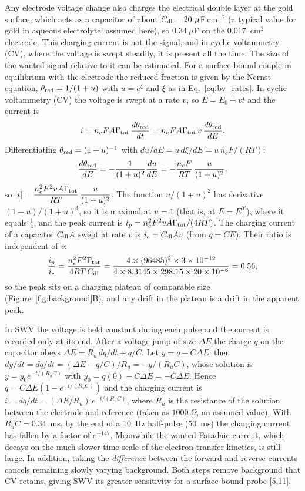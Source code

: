 \documentclass[10pt,a4paper]{article}
\numberwithin{equation}{section}
\newcommand{\cit}[1]{[#1]}
\newcommand{\Grtot}{\Gamma_{\rm tot}}
\newcommand{\Eform}{E^{0\prime}}
\newcommand{\figref}[1]{Figure~\ref{#1}}
\newcommand{\Cdev}{0.34}
\newcommand{\CdlUF}{20}
\newcommand{\RCms}{0.34}
\newcommand{\RuOhm}{1000}
\newcommand{\chargeDecayExp}{147}
\newcommand{\cvRatio}{0.56}
\newcommand{\halfPulseMs}{50}
\begin{document}
Any electrode voltage change also charges the electrical double layer at the gold
surface, which acts as a capacitor of about $C_{\rm dl}=\CdlUF~\mu$F\,cm$^{-2}$
(a typical value for gold in aqueous electrolyte, assumed here), so
$\Cdev~\mu$F on the 0.017~cm$^2$ electrode. This charging current is not the signal, and
in cyclic voltammetry (CV), where the voltage is swept steadily, it is present all the time.
The size of the wanted signal relative to it can be estimated. For a surface-bound couple in equilibrium with the electrode
the reduced fraction is given by the Nernst equation, $\theta_{\rm red}=1/(1+u)$ with $u=e^{\xi}$ and $\xi$ as in
Eq.~\eqref{eq:bv_rates}. In cyclic voltammetry (CV) the voltage is swept at a rate $v$, so
$E=E_0+vt$ and the current is
\[
  i=n_eFA\Grtot\,\frac{d\theta_{\rm red}}{dt}=n_eFA\Grtot\,v\,\frac{d\theta_{\rm red}}{dE}.
\]
Differentiating $\theta_{\rm red}=(1+u)^{-1}$ with $du/dE=u\,d\xi/dE=u\,n_eF/(RT)$:
\[
  \frac{d\theta_{\rm red}}{dE}=-\frac{1}{(1+u)^2}\frac{du}{dE}=-\frac{n_eF}{RT}\,\frac{u}{(1+u)^2},
\]
so $|i|=\dfrac{n_e^2F^2vA\Grtot}{RT}\,\dfrac{u}{(1+u)^2}$.
The function $u/(1+u)^2$ has derivative $(1-u)/(1+u)^3$, so it is maximal at $u=1$ (that is, at $E=\Eform$), where it equals $\tfrac14$, and the peak current is
$i_p=n_e^2F^2vA\Grtot/(4RT)$. The charging current of a capacitor $C_{\rm dl}A$ swept at rate $v$ is
$i_c=C_{\rm dl}Av$ (from $q=CE$). Their ratio is independent of $v$:
\begin{equation}
  \frac{i_p}{i_c}=\frac{n_e^2F^2\Grtot}{4RT\,C_{\rm dl}}
  =\frac{4\times(96485)^2\times3\times10^{-12}}{4\times8.3145\times298.15\times20\times10^{-6}}
  =\cvRatio,
  \label{eq:cv_ratio}
\end{equation}
so the peak sits on a charging plateau of comparable size (\figref{fig:background}B),
and any drift in the plateau is a drift in the apparent peak.

In SWV the voltage is held constant during each pulse and the current is recorded only at
its end. After a voltage jump of size $\Delta E$ the charge $q$ on the capacitor obeys
$\Delta E=R_u\,dq/dt+q/C$. Let $y=q-C\Delta E$; then $dy/dt=dq/dt=(\Delta E-q/C)/R_u=-y/(R_uC)$, whose solution is
$y=y_0e^{-t/(R_uC)}$ with $y_0=q(0)-C\Delta E=-C\Delta E$. Hence $q=C\Delta E(1-e^{-t/(R_uC)})$ and the charging current is
$i=dq/dt=(\Delta E/R_u)\,e^{-t/(R_uC)}$, where
$R_u$ is the resistance of the solution between the electrode and reference (taken as
$\RuOhm~\Omega$, an assumed value). With $R_uC=\RCms$~ms, by the end of a 10~Hz half-pulse
($\halfPulseMs$~ms) the charging current has fallen by a factor of
$e^{-\chargeDecayExp}$. Meanwhile the wanted Faradaic current, which decays on the much
slower time scale of the electron-transfer kinetics, is still large. In addition, taking the
\emph{difference} between the forward and reverse currents cancels remaining slowly varying
background. Both steps remove background that CV retains, giving SWV its greater
sensitivity for a surface-bound probe \cit{5,11}.
\end{document}
